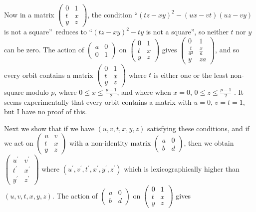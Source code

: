 \documentclass[12pt]{article}
\begin{document}
Now in a matrix $\left( 
\begin{array}{ll}
0 & 1 \\ 
t & x \\ 
y & z%
\end{array}%
\right) $, the condition \textquotedblleft $(tz-xy)^{2}-(ux-vt)(uz-vy)$ is
not a square\textquotedblright\ reduces to \textquotedblleft $(tz-xy)^{2}-ty$
is not a square\textquotedblright , so neither $t$ nor $y$ can be zero. The
action of $\left( 
\begin{array}{ll}
a & 0 \\ 
0 & 1%
\end{array}%
\right) $ on $\left( 
\begin{array}{ll}
0 & 1 \\ 
t & x \\ 
y & z%
\end{array}%
\right) $ gives $\allowbreak \left( 
\begin{array}{cc}
0 & 1 \\ 
\frac{t}{a^{2}} & \frac{x}{a} \\ 
y & za%
\end{array}%
\right) $, and so every orbit contains a matrix $\left( 
\begin{array}{ll}
0 & 1 \\ 
t & x \\ 
y & z%
\end{array}%
\right) $ where $t$ is either one or the least non-square modulo $p$, where $%
0\leq x\leq \frac{p-1}{2}$, and where when $x=0$, $0\leq z\leq \frac{p-1}{2}$%
. It seems experimentally that every orbit contains a matrix with $u=0$, $%
v=t=1$, but I have no proof of this.$\allowbreak $

Next we show that if we have $(u,v,t,x,y,z)$ satisfying these conditions,
and if we act on $\left( 
\begin{array}{ll}
u & v \\ 
t & x \\ 
y & z%
\end{array}%
\right) $ with a non-identity matrix $\left( 
\begin{array}{ll}
a & 0 \\ 
b & d%
\end{array}%
\right) $, then we obtain $\left( 
\begin{array}{ll}
u^{\prime } & v^{\prime } \\ 
t^{\prime } & x^{\prime } \\ 
y^{\prime } & z^{\prime }%
\end{array}%
\right) $ where $(u^{\prime },v^{\prime },t^{\prime },x^{\prime },y^{\prime
},z^{\prime })$ which is lexicographically higher than $(u,v,t,x,y,z)$. The
action of $\left( 
\begin{array}{ll}
a & 0 \\ 
b & d%
\end{array}%
\right) $ on $\left( 
\begin{array}{ll}
0 & 1 \\ 
t & x \\ 
y & z%
\end{array}%
\right) $ gives
\end{document}
